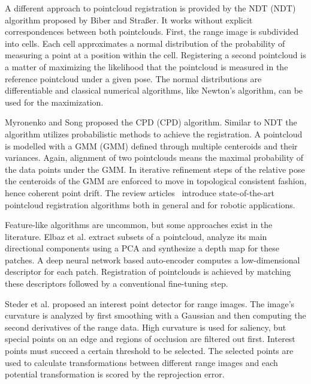 A different approach to pointcloud registration is provided by the \acrlong{NDT} (\acrshort{NDT}) algorithm proposed by Biber and Straßer\cite{biber_iros2003}.
It works without explicit correspondences between both pointclouds.
First, the range image is subdivided into cells.
Each cell approximates a normal distribution of the probability of measuring a point at a position within the cell.
Registering a second pointcloud is a matter of maximizing the likelihood that the pointcloud is measured in the reference pointcloud under a given pose.
The normal distributions are differentiable and classical numerical algorithms, like Newton's algorithm, can be used for the maximization.

Myronenko and Song\cite{myronenko_ieee2010} proposed the \acrlong{CPD} (\acrshort{CPD}) algorithm.
Similar to \acrshort{NDT} the algorithm utilizes probabilistic methods to achieve the registration.
A pointcloud is modelled with a \acrlong{GMM} (\acrshort{GMM}) defined through multiple centeroids and their variances.
Again, alignment of two pointclouds means the maximal probability of the data points under the \acrshort{GMM}.
In iterative refinement steps of the relative pose the centeroids of the \acrshort{GMM} are enforced to move in topological consistent fashion, hence coherent point drift.
The review articles~\cite{bellekens_ambient2014,pomerleau_2015} introduce state-of-the-art pointcloud registration algorithms both in general and for robotic applications.

Feature-like algorithms are uncommon, but some approaches exist in the literature.
Elbaz et al.\cite{elbaz_cvpr2017} extract subsets of a pointcloud, analyze its main directional components using a \acrlong{PCA} and synthesize a depth map for these patches.
A deep neural network based auto-encoder computes a low-dimensional descriptor for each patch.
Registration of pointclouds is achieved by matching these descriptors followed by a conventional fine-tuning step.

Steder et al.\cite{steder_robot2010} proposed an interest point detector for range images.
The image's curvature is analyzed by first smoothing with a Gaussian and then computing the second derivatives of the range data.
High curvature is used for saliency, but special points on an edge and regions of occlusion are filtered out first.
Interest points must succeed a certain threshold to be selected.
The selected points are used to calculate transformations between different range images and each potential transformation is scored by the reprojection error.


